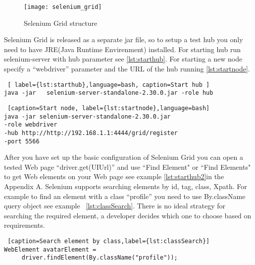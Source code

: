 		\begin{figure}
		\centering
  		\texttt{[image: selenium\_grid]}
  		\caption{Selenium Grid structure}
		\label{fig:selnium_grid}
		\end{figure}
		
		Selenium Grid is released as a separate jar file, so to setup a test hub you
		only need to have JRE(Java Runtime Envirenment) installed. For starting hub
		run selenium-server with hub parameter see \ref{lst:starthub}. For starting
		a new node specify a ``webdriver'' parameter and the URL of the hub running
		\ref{lst:startnode}.
		
		\lstset{style=console}
\begin{lstlisting} [ label={lst:starthub},language=bash, caption=Start hub ]
java -jar	selenium-server-standalone-2.30.0.jar -role hub
\end{lstlisting}

    \lstset{style=console}
\begin{lstlisting} [caption=Start node, label={lst:startnode},language=bash]
java -jar selenium-server-standalone-2.30.0.jar 
-role webdriver
-hub http://http://192.168.1.1:4444/grid/register
-port 5566
\end{lstlisting}
		

	After you have set up the basic configuration of Selenium Grid you can open a
	tested Web page ``driver.get(UIUrl)'' and use ``Find Element" or ``Find
	Elements" to get Web elements on your Web page see example
	\ref{lst:starthub2}in the Appendix A. 
	 Selenium  supports searching elements by id, tag, class, Xpath.
	 For example to find an element with a class ``profile'' you need to use
	 By.className query object see example ~\ref{lst:classSearch}. There is no
	  ideal strategy for searching the required element, a developer
	decides which one to choose based on requirements.
	
	\lstset{style=a1listing}
	\begin{lstlisting} [caption=Search element by class,label={lst:classSearch}]
WebElement avatarElement = 
	 driver.findElement(By.className("profile"));
	\end{lstlisting}